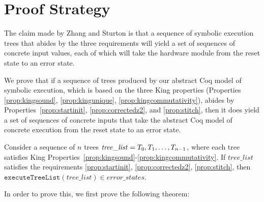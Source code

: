 \section{Proof Strategy}
The claim made by Zhang and Sturton is that a sequence of symbolic execution
trees that abides by the three requirements will yield a set of sequences of concrete
input values, each of which will take the hardware module from the reset state to an
error state.

We prove that if a sequence of trees produced by our abstract Coq model of symbolic
execution, which is based on the three King properties (Properties
\ref{prop:kingsound}, \ref{prop:kingunique}, \ref{prop:kingcommutativity}), abides by
Properties~\ref{prop:startinit}, \ref{prop:correctedz2}, and \ref{prop:stitch}, then
it does yield a set of sequences of concrete inputs that take the abstract Coq model of
concrete execution from the reset state to an error state.









\begin{theorem}
\label{thm:sufficiency} Consider a sequence of $n$ trees $\mathit{tree\_list} =
T_0, T_1, \ldots, T_{n-1}$, where each tree satisfies King
Properties~\ref{prop:kingsound}-\ref{prop:kingcommutativity}. If
$\mathit{tree\_list}$ satisfies the requirements \ref{prop:startinit},
\ref{prop:correctedz2}, \ref{prop:stitch}, then 
$\mathtt{executeTreeList }(tree\_list) \in error\_states$.
\end{theorem}
 
 In order to prove this, we first prove the following theorem:

